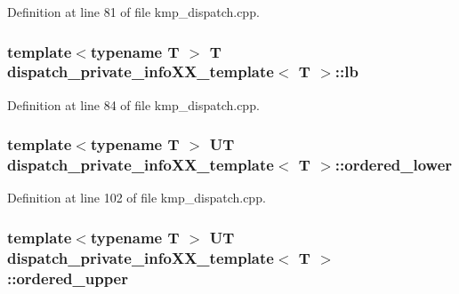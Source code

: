 Definition at line 81 of file kmp\-\_\-dispatch.\-cpp.

\hypertarget{structdispatch__private__infoXX__template_a2bbe8f513cfe2b671e820dfebc014ae4}{
\subsubsection[{lb}]{\setlength{\rightskip}{0pt plus 5cm}template$<$typename T $>$ T {\bf dispatch\-\_\-private\-\_\-info\-X\-X\-\_\-template}$<$ T $>$\-::lb}}\label{structdispatch__private__infoXX__template_a2bbe8f513cfe2b671e820dfebc014ae4}


Definition at line 84 of file kmp\-\_\-dispatch.\-cpp.

\hypertarget{structdispatch__private__infoXX__template_aa7422dc1e95ed19c25a6a8781fd2f778}{
\subsubsection[{ordered\-\_\-lower}]{\setlength{\rightskip}{0pt plus 5cm}template$<$typename T $>$ {\bf U\-T} {\bf dispatch\-\_\-private\-\_\-info\-X\-X\-\_\-template}$<$ T $>$\-::ordered\-\_\-lower}}\label{structdispatch__private__infoXX__template_aa7422dc1e95ed19c25a6a8781fd2f778}


Definition at line 102 of file kmp\-\_\-dispatch.\-cpp.

\hypertarget{structdispatch__private__infoXX__template_ae5b4524bb3ea2f6fced39f058a72b230}{
\subsubsection[{ordered\-\_\-upper}]{\setlength{\rightskip}{0pt plus 5cm}template$<$typename T $>$ {\bf U\-T} {\bf dispatch\-\_\-private\-\_\-info\-X\-X\-\_\-template}$<$ T $>$\-::ordered\-\_\-upper}}\label{structdispatch__private__infoXX__template_ae5b4524bb3ea2f6fced39f058a72b230}



